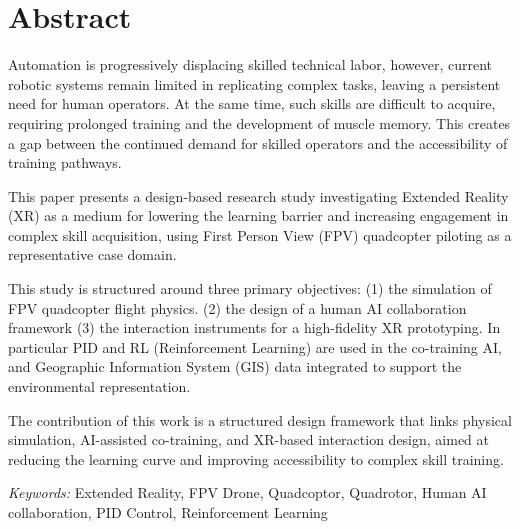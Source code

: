 
\newpage
\thispagestyle{empty} 
\setcounter{page}{2}
\section*{\centering Abstract}
\noindent 
Automation is progressively displacing skilled technical labor, however, current robotic systems remain limited in replicating complex tasks, leaving a persistent need for human operators. At the same time, such skills are difficult to acquire, requiring prolonged training and the development of muscle memory. This creates a gap between the continued demand for skilled operators and the accessibility of training pathways.

\noindent
This paper presents a design-based research study investigating Extended Reality (XR) as a medium for lowering the learning barrier and increasing engagement in complex skill acquisition, using First Person View (FPV) quadcopter piloting as a representative case domain.

\noindent
This study is structured around three primary objectives: (1) the simulation of FPV quadcopter flight physics. (2) the design of a human AI collaboration framework (3) the interaction instruments for a high-fidelity XR prototyping. In particular PID and RL (Reinforcement Learning) are used in the co-training AI, and Geographic Information System (GIS) data integrated to support the environmental representation.

\noindent
The contribution of this work is a structured design framework that links physical simulation, AI-assisted co-training, and XR-based interaction design, aimed at reducing the learning curve and improving accessibility to complex skill training.

\vspace{0.5in} 
\textit{Keywords:} 
Extended Reality, 
FPV Drone, 
Quadcoptor,
Quadrotor,
Human AI collaboration,
PID Control,
Reinforcement Learning
